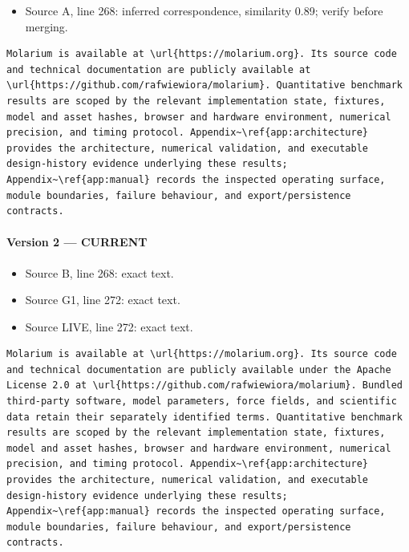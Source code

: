\documentclass[11pt]{article}
\begin{document}
\begin{itemize}[leftmargin=*]
\item Source A, line 268: inferred correspondence, similarity 0.89; verify before merging.
\end{itemize}

\begin{lstlisting}
Molarium is available at \url{https://molarium.org}. Its source code and technical documentation are publicly available at \url{https://github.com/rafwiewiora/molarium}. Quantitative benchmark results are scoped by the relevant implementation state, fixtures, model and asset hashes, browser and hardware environment, numerical precision, and timing protocol. Appendix~\ref{app:architecture} provides the architecture, numerical validation, and executable design-history evidence underlying these results; Appendix~\ref{app:manual} records the inspected operating surface, module boundaries, failure behaviour, and export/persistence contracts.
\end{lstlisting}

\paragraph{Version 2 --- CURRENT}

\begin{itemize}[leftmargin=*]
\item Source B, line 268: exact text.
\item Source G1, line 272: exact text.
\item Source LIVE, line 272: exact text.
\end{itemize}

\begin{lstlisting}
Molarium is available at \url{https://molarium.org}. Its source code and technical documentation are publicly available under the Apache License 2.0 at \url{https://github.com/rafwiewiora/molarium}. Bundled third-party software, model parameters, force fields, and scientific data retain their separately identified terms. Quantitative benchmark results are scoped by the relevant implementation state, fixtures, model and asset hashes, browser and hardware environment, numerical precision, and timing protocol. Appendix~\ref{app:architecture} provides the architecture, numerical validation, and executable design-history evidence underlying these results; Appendix~\ref{app:manual} records the inspected operating surface, module boundaries, failure behaviour, and export/persistence contracts.
\end{lstlisting}
\end{document}
